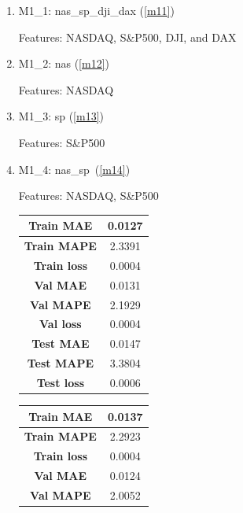 \begin{enumerate}
	\item M1\_1: nas\_sp\_dji\_dax (\autoref{m11})
	
	Features: NASDAQ, S\&P500, DJI, and DAX
	
	\item M1\_2: nas (\autoref{m12})
	
	Features: NASDAQ
	
	\item M1\_3: sp (\autoref{m13})
	
	Features: S\&P500
	
	\item M1\_4: nas\_sp\ (\autoref{m14})
	
	Features: NASDAQ, S\&P500
	
	\begin{table}[H]
		\centering
		\begin{minipage}{0.45\textwidth}
			\centering
			\begin{tabular}{|c|c|}
				\hline
				\textbf{Train MAE}  & 0.0127 \\
				\hline
				\textbf{Train MAPE} & 2.3391 \\
				\hline
				\textbf{Train loss} & 0.0004 \\
				\hline
				\textbf{Val MAE}    & 0.0131 \\
				\hline
				\textbf{Val MAPE}   & 2.1929 \\
				\hline
				\textbf{Val loss}   & 0.0004 \\
				\hline
				\textbf{Test MAE}   & 0.0147 \\
				\hline
				\textbf{Test MAPE}  & 3.3804 \\
				\hline
				\textbf{Test loss}  & 0.0006 \\
				\hline
			\end{tabular}
			\label{m11}
		\end{minipage}
		\begin{minipage}{0.45\textwidth}
			\centering
			\begin{tabular}{|c|c|}
				\hline
				\textbf{Train MAE}  & 0.0137 \\
				\hline
				\textbf{Train MAPE} & 2.2923 \\
				\hline
				\textbf{Train loss} & 0.0004 \\
				\hline
				\textbf{Val MAE}    & 0.0124 \\
				\hline
				\textbf{Val MAPE}   & 2.0052 \\

\end{tabular}
\end{minipage}
\end{table}
\end{enumerate}
